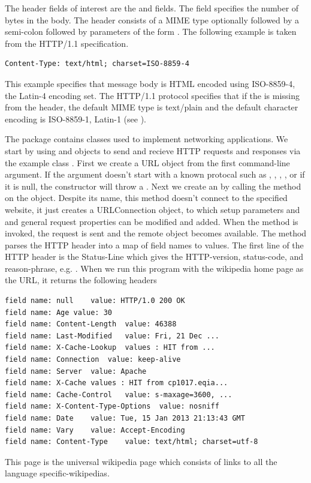 The header fields of interest are the  and  fields.
The  field specifies the number of bytes in the body.
The  header consists of a MIME type optionally followed by 
a semi-colon followed by parameters of the form .
The following example is taken from the HTTP/1.1 specification.
\begin{verbatim}
Content-Type: text/html; charset=ISO-8859-4
\end{verbatim}
This example specifies that message body is HTML encoded using
ISO-8859-4, the Latin-4 encoding set.
The HTTP/1.1 protocol specifies that if the  is missing from the header,
the default MIME type is text/plain and the default
character encoding is ISO-8859-1, Latin-1 (see ).

The  package contains classes used to implement networking applications.
We start by using  and  objects
to send and recieve HTTP requests and responses via the example class .
%
%
%
First we create a URL object from the first command-line argument.
If the argument doesn't start with a known protocal such as
, , , , or if it is null,
the constructor will throw a .
Next we create an  by calling the 
method on the  object.
Despite its name, this method doesn't connect to the specified website, it just
creates a URLConnection object, to which setup parameters and and general 
request properties can be modified and added.
When the  method is invoked, the request is sent and the remote object
becomes available.  
%
%
The method  parses the HTTP header into a map of
field names to values.
The first line of the HTTP header is the Status-Line which gives the
HTTP-version, status-code, and  reason-phrase, e.g.
.
When we run this program with the wikipedia home page as the URL,
it returns the following headers
%
\begin{verbatim}  
field name: null	value: HTTP/1.0 200 OK 
field name: Age	value: 30
field name: Content-Length	value: 46388
field name: Last-Modified	value: Fri, 21 Dec ...
field name: X-Cache-Lookup	values : HIT from ...
field name: Connection	value: keep-alive
field name: Server	value: Apache
field name: X-Cache	values : HIT from cp1017.eqia...
field name: Cache-Control	value: s-maxage=3600, ...
field name: X-Content-Type-Options	value: nosniff
field name: Date	value: Tue, 15 Jan 2013 21:13:43 GMT
field name: Vary	value: Accept-Encoding
field name: Content-Type	value: text/html; charset=utf-8
\end{verbatim}
%
This page is the universal wikipedia page which consists of links to all
the language specific-wikipedias.

